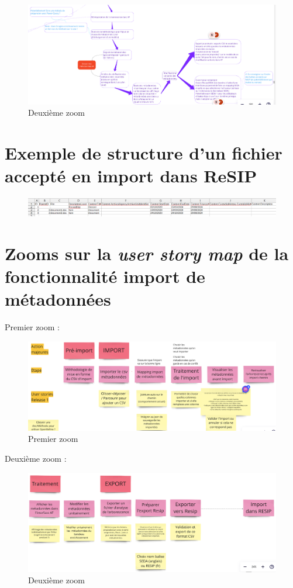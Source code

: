 \documentclass[a4paper,12pt,twoside]{book}
\begin{document}
	\begin{figure}[h]
		\centering
		\includegraphics[scale=0.4]{annexes/annexe6.2.png}
		\caption{Deuxième zoom}
		\label{annexe6.2}
	\end{figure}
	
	\chapter[Import ReSIP]{Exemple de structure d'un fichier accepté en import dans ReSIP} 
	\begin{figure}[h]
		\centering
		\includegraphics[scale=0.6]{annexes/annexe7.png}
		\label{annexe7}
	\end{figure}
	
	\chapter[Zooms story map]{Zooms sur la \textit{user \gls{story map}} de la fonctionnalité import de métadonnées}

Premier zoom :
	\begin{figure}[h]
		\centering
		\includegraphics[scale=0.4]{annexes/annexe8.1.png}
		\caption{Premier zoom}
		\label{annexe8.1}
	\end{figure}
Deuxième zoom :
	\begin{figure}[h]
		\centering
		\includegraphics[scale=0.4]{annexes/annexe8.2.png}
		\caption{Deuxième zoom}
		\label{annexe8.2}
	\end{figure}
\end{document}
